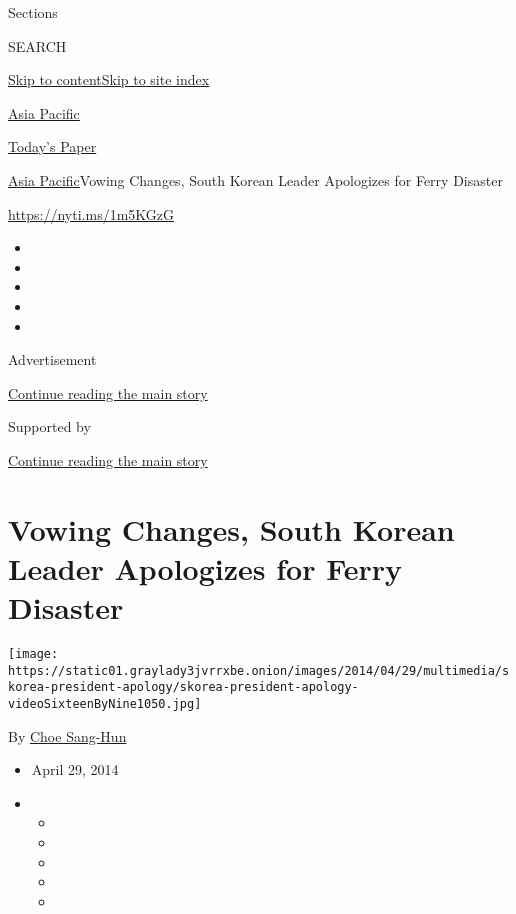 Sections

SEARCH

\protect\hyperlink{site-content}{Skip to
content}\protect\hyperlink{site-index}{Skip to site index}

\href{https://www.nytimes3xbfgragh.onion/section/world/asia}{Asia
Pacific}

\href{https://myaccount.nytimes3xbfgragh.onion/auth/login?response_type=cookie\&client_id=vi}{}

\href{https://www.nytimes3xbfgragh.onion/section/todayspaper}{Today's
Paper}

\href{/section/world/asia}{Asia Pacific}\textbar{}Vowing Changes, South
Korean Leader Apologizes for Ferry Disaster

\url{https://nyti.ms/1m5KGzG}

\begin{itemize}
\item
\item
\item
\item
\item
\end{itemize}

Advertisement

\protect\hyperlink{after-top}{Continue reading the main story}

Supported by

\protect\hyperlink{after-sponsor}{Continue reading the main story}

\hypertarget{vowing-changes-south-korean-leader-apologizes-for-ferry-disaster}{%
\section{Vowing Changes, South Korean Leader Apologizes for Ferry
Disaster}\label{vowing-changes-south-korean-leader-apologizes-for-ferry-disaster}}

\texttt{[image: https://static01.graylady3jvrrxbe.onion/images/2014/04/29/multimedia/skorea-president-apology/skorea-president-apology-videoSixteenByNine1050.jpg]}

By \href{http://www.nytimes3xbfgragh.onion/by/choe-sang-hun}{Choe
Sang-Hun}

\begin{itemize}
\item
  April 29, 2014
\item
  \begin{itemize}
  \item
  \item
  \item
  \item
  \item
  \end{itemize}
\end{itemize}

